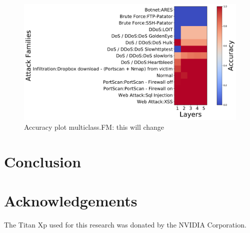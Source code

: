 \documentclass[conference]{IEEEtran}
\newcommand\note[2]{{\color{#1}#2}}
\begin{document}
\begin{figure}[b!]
\includegraphics[width=\columnwidth]{figures/acc_multiclass_Jul10_15-18-24_gpu_0_3.pdf}
\caption{Accuracy plot multiclass.\note{red}{FM: this will change}}
\label{fig:pdp_ttl}
\end{figure}


\section{Conclusion}


\section*{Acknowledgements}
The Titan Xp used for this research was donated by the NVIDIA Corporation.



\end{document}
